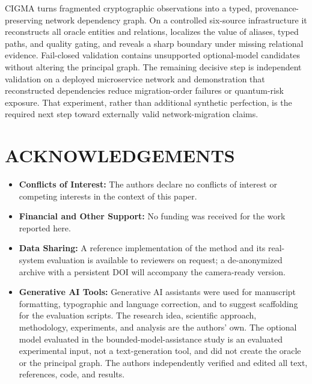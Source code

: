 \documentclass[a4paper,twoside]{article}
\newcommand{\cigma}{CIGMA\xspace}
\begin{document}
\cigma turns fragmented cryptographic observations into a typed, provenance-preserving network dependency graph. On a controlled six-source infrastructure it reconstructs all oracle entities and relations, localizes the value of aliases, typed paths, and quality gating, and reveals a sharp boundary under missing relational evidence. Fail-closed validation contains unsupported optional-model candidates without altering the principal graph. The remaining decisive step is independent validation on a deployed microservice network and demonstration that reconstructed dependencies reduce migration-order failures or quantum-risk exposure. That experiment, rather than additional synthetic perfection, is the required next step toward externally valid network-migration claims.

\section*{\uppercase{Acknowledgements}}

\begin{itemize}
\item \textbf{Conflicts of Interest:} The authors declare no conflicts of interest or competing interests in the context of this paper.
\item \textbf{Financial and Other Support:} No funding was received for the work reported here.
\item \textbf{Data Sharing:} A reference implementation of the method and its real-system evaluation is available to reviewers on request; a de-anonymized archive with a persistent DOI will accompany the camera-ready version.
\item \textbf{Generative AI Tools:} Generative AI assistants were used for manuscript formatting, typographic and language correction, and to suggest scaffolding for the evaluation scripts. The research idea, scientific approach, methodology, experiments, and analysis are the authors' own. The optional model evaluated in the bounded-model-assistance study is an evaluated experimental input, not a text-generation tool, and did not create the oracle or the principal graph. The authors independently verified and edited all text, references, code, and results.
\end{itemize}

\balance

{\small
}
\end{document}
